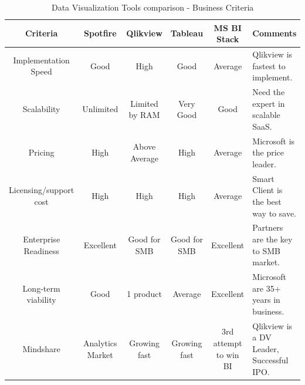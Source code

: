\begin{table}[p] 

\caption{Data Visualization Tools comparison - Business Criteria \cite{compare}} %
\centering      %

\begin{tabular}{c c c c c p{3cm}}  %
\hline\hline 
    \textbf{Criteria} & \textbf{Spotfire} &  \textbf{Qlikview} & \textbf{Tableau} & \textbf{MS BI Stack} & \textbf{Comments} \\ \hline
    Implementation Speed & Good & High & Good & Average & Qlikview is fastest to implement.\\
    Scalability & Unlimited & Limited by RAM & Very Good & Good & Need the expert in scalable SaaS.\\
    Pricing & High & Above Average & High & Average & Microsoft is the price leader.\\
    Licensing/support cost  & High & High & High & Average & Smart Client is the best way to save.\\
    Enterprise Readiness & Excellent & Good for SMB	 & Good for SMB	 & Excellent & Partners are the key to SMB market.\\
    Long-term viability & Good & 1 product & Average & Excellent & Microsoft are 35+ years in business.\\
    Mindshare & Analytics Market & Growing fast & Growing fast & 3rd attempt to win BI & Qlikview is a DV Leader, Successful IPO.\\
     \hline     %
    \end{tabular} 
    \label{table:comparision1}  %
    \end{table} 
    

